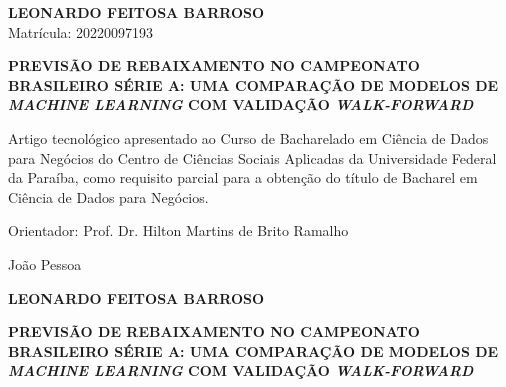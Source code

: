 \documentclass[
    article,
    12pt,
    oneside,
    a4paper,
    english,
    brazilian
    ]{abntex2}
\begin{document}
\pretextual
\maketitle
\newpage

\thispagestyle{empty}
\begin{center}
    \textbf{LEONARDO FEITOSA BARROSO} \\
    \small Matrícula: 20220097193

    \vspace{4cm}

    \textbf{\large PREVISÃO DE REBAIXAMENTO NO CAMPEONATO BRASILEIRO SÉRIE A: UMA COMPARAÇÃO DE MODELOS DE \textit{MACHINE LEARNING} COM VALIDAÇÃO \textit{WALK-FORWARD}}
\end{center}

\vspace{2.5cm}

\hfill\begin{minipage}{0.55\textwidth}
    \small\SingleSpacing
    Artigo tecnológico apresentado ao Curso de Bacharelado em Ciência de Dados para Negócios do Centro de Ciências Sociais Aplicadas da Universidade Federal da Paraíba, como requisito parcial para a obtenção do título de Bacharel em Ciência de Dados para Negócios.

    \vspace{0.8em}
    Orientador: Prof. Dr. Hilton Martins de Brito Ramalho
\end{minipage}

\vfill

\begin{center}
    João Pessoa \\
    \the\year
\end{center}
\newpage

\thispagestyle{empty}
\begin{center}
    \textbf{LEONARDO FEITOSA BARROSO}

    \vspace{1.5cm}

    \textbf{\large PREVISÃO DE REBAIXAMENTO NO CAMPEONATO BRASILEIRO SÉRIE A: UMA COMPARAÇÃO DE MODELOS DE \textit{MACHINE LEARNING} COM VALIDAÇÃO \textit{WALK-FORWARD}}
\end{center}
\end{document}
